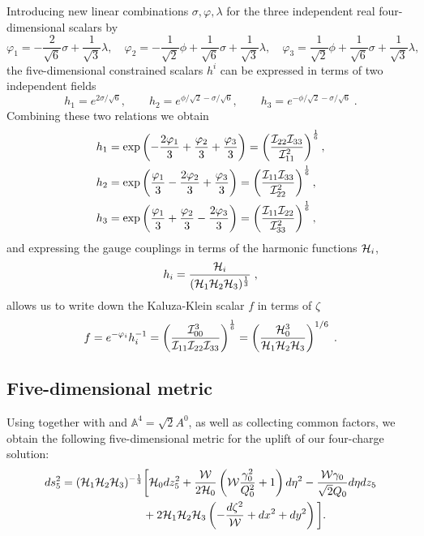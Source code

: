 Introducing new linear combinations $\sigma, \varphi, \lambda$ for the three independent real four-dimensional scalars by
\begin{equation*}
     \varphi_1 = -\frac{2}{\sqrt{6}} \sigma + \frac{1}{\sqrt{3}} \lambda, \quad \varphi_2 = -\frac{1}{\sqrt{2}} \phi + \frac{1}{\sqrt{6}} \sigma + \frac{1}{\sqrt{3}} \lambda, \quad \varphi_3 = \frac{1}{\sqrt{2}} \phi + \frac{1}{\sqrt{6}} \sigma + \frac{1}{\sqrt{3}} \lambda,
\end{equation*}
the five-dimensional constrained scalars $h^i$ can be expressed in terms of two independent fields
\begin{equation*}
 h_1 = e^{2 \sigma/\sqrt{6}}, \qquad h_2 = e^{\phi/\sqrt{2} - \sigma/\sqrt{6}}, \qquad h_3 = e^{-\phi/\sqrt{2} - \sigma/\sqrt{6}} \; .
\end{equation*}
Combining these two relations we obtain
\begin{equation*}
    \begin{aligned}
        h_1 &= \exp \left(-\frac{2\varphi_1}{3} + \frac{\varphi_2}{3} + \frac{\varphi_3}{3} \right) = \left( \frac{{\cal I}_{22} {\cal I}_{33} }{{\cal I}^2_{11}} \right)^{\frac{1}{6}}, \\
        h_2 &= \exp \left(\frac{\varphi_1}{3} - \frac{2\varphi_2}{3} + \frac{\varphi_3}{3} \right) = \left( \frac{{\cal I}_{11} {\cal I}_{33} }{{\cal I}^2_{22}} \right)^{\frac{1}{6}}, \\
        h_3 &= \exp \left(\frac{\varphi_1}{3} + \frac{\varphi_2}{3} - \frac{2 \varphi_3}{3} \right) = \left( \frac{{\cal I}_{11} {\cal I}_{22} }{{\cal I}^2_{33}} \right)^{\frac{1}{6}} ,
    \end{aligned}
\end{equation*}
and expressing the gauge couplings in terms of the harmonic functions ${\cal H}_i$,
\begin{equation}
\label{hi_Harmonic}
        h_i = \frac{{\cal H}_i}{({\cal H}_1 {\cal H}_2 {\cal H}_3)^{\frac{1}{3}}} \; ,
\end{equation}
allows us to write down the Kaluza-Klein scalar $f$ in terms of $\zeta$
\begin{equation}
\label{eq:5dkk}
    f = e^{-\varphi_i} h_i^{-1} = \left(\frac{{\cal I}_{00}^3}{{\cal I}_{11} {\cal I}_{22} {\cal I}_{33}} \right)^{\frac{1}{6}}
    = \left( \frac{ {\cal H}_0^3}{{\cal H}_1 {\cal H}_2 {\cal H}_3} \right)^{1/6} \;.
\end{equation}
\subsection*{Five-dimensional metric}
Using  together with  and $\mathbb{A}^4 = \sqrt{2} A^0$, as well as
collecting common factors, we obtain the following five-dimensional metric for the uplift of our four-charge solution:
\begin{equation}
\begin{aligned}
        ds^2_5 = ({\cal H}_1 {\cal H}_2 {\cal H}_3)^{-\frac{1}{3}} &\bigg[{\cal H}_0 dz_5^2 + \frac{{\cal W}}{2{\cal H}_0}\left({\cal W} \frac{\gamma_0^2}{Q_0^2} + 1 \right) d\eta^2 - \frac{{\cal W} \gamma_0}{\sqrt{2} Q_0} d\eta dz_5 \\ &+ 2{\cal H}_1 {\cal H}_2 {\cal H}_3 \left(- \frac{ d\zeta^2}{{\cal W}} + dx^2 + dy^2 \right) \bigg].
\end{aligned}
\end{equation}

